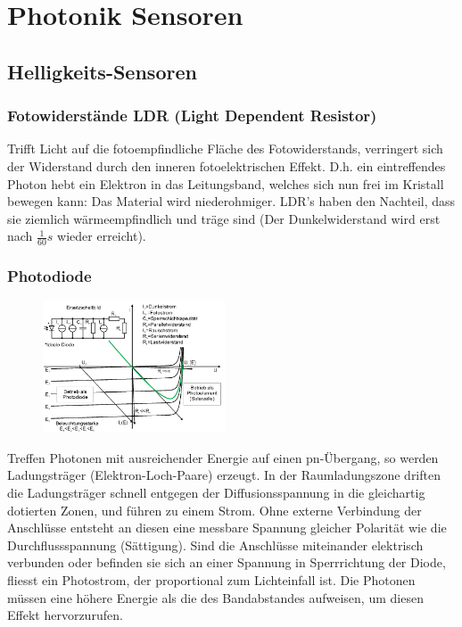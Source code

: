 \section{Photonik Sensoren}
\subsection{Helligkeits-Sensoren}
\subsubsection{Fotowiderstände LDR (Light Dependent Resistor)}
Trifft Licht auf die fotoempfindliche Fläche des Fotowiderstands, verringert sich der Widerstand durch den inneren fotoelektrischen Effekt. D.h. ein eintreffendes Photon hebt ein Elektron in das Leitungsband, welches sich nun frei im Kristall bewegen kann: Das Material wird niederohmiger. LDR's haben den Nachteil, dass sie ziemlich wärmeempfindlich und träge sind (Der Dunkelwiderstand wird erst nach $\frac{1}{60}s$ wieder erreicht).

\subsubsection{Photodiode}
\begin{figure}
    \vspace{-12pt}
    \centering
    \includegraphics[width=0.48\textwidth]{images/photodiode}
\end{figure}
Treffen Photonen mit ausreichender Energie auf einen pn-Übergang, so werden Ladungsträger (Elektron-Loch-Paare) erzeugt. In der Raumladungszone driften die Ladungsträger schnell entgegen der Diffusionsspannung in die gleichartig dotierten Zonen, und führen zu einem Strom. Ohne externe Verbindung der Anschlüsse entsteht an diesen eine messbare Spannung gleicher Polarität wie die Durchflussspannung (Sättigung). Sind die Anschlüsse miteinander elektrisch verbunden oder befinden sie sich an einer Spannung in Sperrrichtung der Diode, fliesst ein Photostrom, der proportional zum Lichteinfall ist. Die Photonen müssen eine höhere Energie als die des Bandabstandes aufweisen, um diesen Effekt hervorzurufen.

